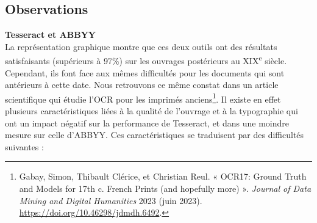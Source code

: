 \documentclass[a4paper,12pt,twoside]{book}
\begin{document}
	\subsection{Observations}
	
	\textbf{Tesseract et ABBYY} \\

La représentation graphique montre que ces deux outils ont des résultats
satisfaisants (supérieurs à 97\%) sur les ouvrages postérieurs au
XIX\textsuperscript{e} siècle. Cependant, ils font face aux mêmes
difficultés pour les documents qui sont antérieurs à cette date. Nous
retrouvons ce même constat dans un article scientifique qui étudie l'OCR
pour les imprimés anciens\footnote{Gabay, Simon, Thibault Clérice, et
	Christian Reul. « OCR17: Ground Truth and Models for 17th c. French
	Prints (and hopefully more) ». \emph{Journal of Data Mining and
		Digital Humanities} 2023 (juin 2023).
	\url{https://doi.org/10.46298/jdmdh.6492}.}.
Il existe en effet plusieurs caractéristiques liées à la qualité de
l'ouvrage et à la typographie qui ont un impact négatif sur la
performance de Tesseract, et dans une moindre mesure sur celle d'ABBYY.
Ces caractéristiques se traduisent par des difficultés suivantes : \\
\end{document}
